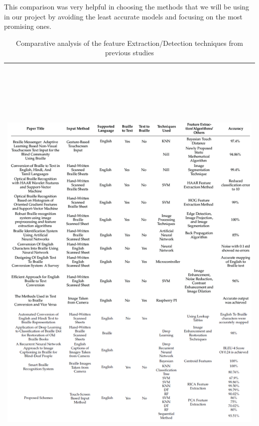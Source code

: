 This comparison was very helpful in choosing the methods that we will be using in our project by avoiding the least accurate models and focusing on the most promising ones.
\newpage
\begin{table}[h!]
    \centering
    \begin{tabular}{|c|}
        \hline
        \includegraphics[width=\textwidth,height=22cm]{table 2.1.PNG} \\
        \hline
    \end{tabular}
    \caption{Comparative analysis of the feature Extraction/Detection techniques from previous studies }
    \label{tab: comparison}
\end{table}


